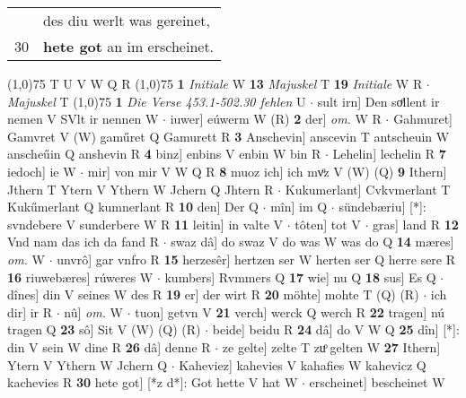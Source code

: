 \documentclass[8pt,a4paper,notitlepage]{article}
\begin{document}
\begin{table}[ht]
\begin{minipage}[t]{0.5\linewidth}
\begin{tabular}{rl}
 & des diu werlt was gereinet,\\ 
30 & \textbf{hete got} an im erscheinet.\\ 
\end{tabular}
\scriptsize
\line(1,0){75} \newline
T U V W Q R \newline
\line(1,0){75} \newline
\textbf{1} \textit{Initiale} W  \textbf{13} \textit{Majuskel} T  \textbf{19} \textit{Initiale} W R   $\cdot$ \textit{Majuskel} T  \newline
\line(1,0){75} \newline
\textbf{1} \textit{Die Verse 453.1-502.30 fehlen} U   $\cdot$ sult irn] Den soͤllent ir nemen V SVlt ir nennen W  $\cdot$ iuwer] eúwerm W (R) \textbf{2} der] \textit{om.} W R  $\cdot$ Gahmuret] Gamvret V (W) gaműret Q Gamurett R \textbf{3} Anschevin] anscevin T antscheuin W anscheűin Q anshevin R \textbf{4} binz] enbins V enbin W bin R  $\cdot$ Lehelin] lechelin R \textbf{7} iedoch] ie W  $\cdot$ mir] von mir V W Q R \textbf{8} muoz ich] ich mvͦz V (W) (Q) \textbf{9} Ithern] Jthern T Ytern V Ythern W Jchern Q Jhtern R  $\cdot$ Kukumerlant] Cvkvmerlant T Kukűmerlant Q kumnerlant R \textbf{10} den] Der Q  $\cdot$ mîn] im Q  $\cdot$ sündebæriu] [*]: svndebere V sunderbere W R \textbf{11} leitin] in valte V  $\cdot$ tôten] tot V  $\cdot$ gras] land R \textbf{12} Vnd nam das ich da fand R  $\cdot$ swaz dâ] do swaz V do was W was do Q \textbf{14} mæres] \textit{om.} W  $\cdot$ unvrô] gar vnfro R \textbf{15} herzesêr] hertzen ser W herten ser Q herre sere R \textbf{16} riuwebæres] rúweres W  $\cdot$ kumbers] Rvmmers Q \textbf{17} wie] nu Q \textbf{18} sus] Es Q  $\cdot$ dînes] din V seines W des R \textbf{19} er] der wirt R \textbf{20} möhte] mohte T (Q) (R)  $\cdot$ ich dir] ir R  $\cdot$ nû] \textit{om.} W  $\cdot$ tuon] getvn V \textbf{21} verch] werck Q werch R \textbf{22} tragen] nú tragen Q \textbf{23} sô] Sit V (W) (Q) (R)  $\cdot$ beide] beidu R \textbf{24} dâ] do V W Q \textbf{25} dîn] [*]: din V sein W dine R \textbf{26} dâ] denne R  $\cdot$ ze gelte] zelte T zuͦ gelten W \textbf{27} Ithern] Ytern V Ythern W Jchern Q  $\cdot$ Kaheviez] kahevies V kahafies W kahevicz Q kachevies R \textbf{30} hete got] [*z d*]: Got hette V hat W  $\cdot$ erscheinet] bescheinet W \newline
\end{minipage}
\end{table}
\end{document}
